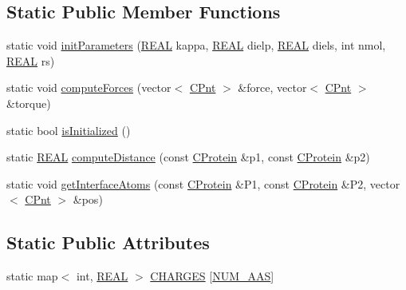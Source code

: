\subsection*{Static Public Member Functions}
\begin{DoxyCompactItemize}
\item 
static void \hyperlink{classCProtein_aeff60f05cbd42168359f75187b9ac888}{init\-Parameters} (\hyperlink{util_8h_a5821460e95a0800cf9f24c38915cbbde}{R\-E\-A\-L} kappa, \hyperlink{util_8h_a5821460e95a0800cf9f24c38915cbbde}{R\-E\-A\-L} dielp, \hyperlink{util_8h_a5821460e95a0800cf9f24c38915cbbde}{R\-E\-A\-L} diels, int nmol, \hyperlink{util_8h_a5821460e95a0800cf9f24c38915cbbde}{R\-E\-A\-L} rs)
\item 
static void \hyperlink{classCProtein_a7d6c3fb53c773ea006d123e35301d9b8}{compute\-Forces} (vector$<$ \hyperlink{classCPnt}{C\-Pnt} $>$ \&force, vector$<$ \hyperlink{classCPnt}{C\-Pnt} $>$ \&torque)
\item 
static bool \hyperlink{classCProtein_a60767b1667e57c9a68045a6c148799cd}{is\-Initialized} ()
\item 
static \hyperlink{util_8h_a5821460e95a0800cf9f24c38915cbbde}{R\-E\-A\-L} \hyperlink{classCProtein_a3d071c05412cb0f2a423920d5ae000dc}{compute\-Distance} (const \hyperlink{classCProtein}{C\-Protein} \&p1, const \hyperlink{classCProtein}{C\-Protein} \&p2)
\item 
static void \hyperlink{classCProtein_a2e38b7c42c30f967591fafb5060bc4f7}{get\-Interface\-Atoms} (const \hyperlink{classCProtein}{C\-Protein} \&P1, const \hyperlink{classCProtein}{C\-Protein} \&P2, vector$<$ \hyperlink{classCPnt}{C\-Pnt} $>$ \&pos)
\end{DoxyCompactItemize}
\subsection*{Static Public Attributes}
\begin{DoxyCompactItemize}
\item 
static map$<$ int, \hyperlink{util_8h_a5821460e95a0800cf9f24c38915cbbde}{R\-E\-A\-L} $>$ \hyperlink{classCProtein_a5999d9758c6552f1c329cb3b5612485d}{C\-H\-A\-R\-G\-E\-S} \mbox{[}\hyperlink{pdb_8h_aaa82008f92b935630ccf49c27a4bcc6e}{N\-U\-M\-\_\-\-A\-A\-S}\mbox{]}
\end{DoxyCompactItemize}


